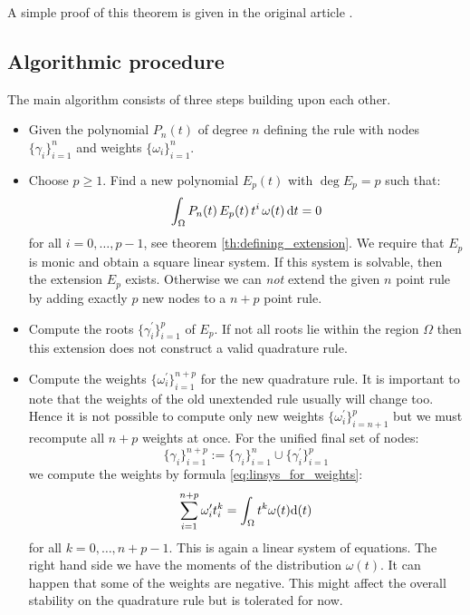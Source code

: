 \documentclass[a4paper,10pt]{article}
\begin{document}
A simple proof of this theorem is given in the original article \cite{mehrotra-papp}.



\FloatBarrier
\subsection{Algorithmic procedure}

The main algorithm consists of three steps building upon each other.

\begin{itemize}
  \item Given the polynomial $P_n(t)$ of degree $n$ defining the rule
    with nodes $\{\gamma_i\}_{i=1}^{n}$ and weights $\{\omega_i\}_{i=1}^{n}$.
  \item Choose $p \geq 1$.
    Find a new polynomial $E_p(t)$ with $\deg E_p = p$ such that:
    \begin{equation}
      \int_{\Omega} P_n(t) \, E_p(t) \, t^i \, \omega(t) \, \mathrm{d}t = 0
    \end{equation}
    for all $i = 0, \ldots, p-1$, see theorem \ref{th:defining_extension}.
    We require that $E_p$ is monic and obtain a square linear system.
    If this system is solvable, then the extension $E_p$ exists.
    Otherwise we can \emph{not} extend the given $n$ point rule by
    adding exactly $p$ new nodes to a $n+p$ point rule.
  \item Compute the roots $\{\gamma^\prime_i\}_{i=1}^{p}$ of $E_p$.
    If not all roots lie within the region $\Omega$ then this extension
    does not construct a valid quadrature rule.
  \item Compute the weights $\{\omega^\prime_i\}_{i=1}^{n+p}$ for the new
    quadrature rule. It is important to note that the weights of the old
    unextended rule usually will change too. Hence it is not possible to
    compute only new weights $\{\omega^\prime_i\}_{i=n+1}^{p}$ but we must
    recompute all $n+p$ weights at once. For the unified final set of nodes:
    \begin{equation}
      \{\gamma_i\}_{i=1}^{n+p} := \{\gamma_i\}_{i=1}^{n} \cup \{\gamma^\prime_i\}_{i=1}^{p}
    \end{equation}
    we compute the weights by formula \eqref{eq:linsys_for_weights}:
    \begin{equation}
      \sum_{i=1}^{n+p} \omega^\prime_i t_i^k = \int_{\Omega} t^k \omega(t) \mathrm{d}(t)
    \end{equation}
    for all $k=0, \ldots, n+p-1$. This is again a linear system
    of equations. The right hand side we have the moments of the
    distribution $\omega(t)$. It can happen that some of the weights
    are negative. This might affect the overall stability on the quadrature
    rule but is tolerated for now.
\end{itemize}
\end{document}
